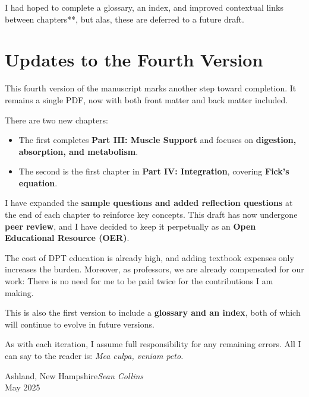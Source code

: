 I had hoped to complete a glossary, an index, and improved contextual links between chapters**, but alas, these are deferred to a future draft.  

\section*{Updates to the Fourth Version}

This fourth version of the manuscript marks another step toward completion. It remains a single PDF, now with both front matter and back matter included.  

There are two new chapters:
\begin{itemize}
  \item The first completes \textbf{Part III: Muscle Support} and focuses on \textbf{digestion, absorption, and metabolism}.
  \item The second is the first chapter in \textbf{Part IV: Integration}, covering \textbf{Fick’s equation}.
\end{itemize}

I have expanded the \textbf{sample questions and added reflection questions} at the end of each chapter to reinforce key concepts. This draft has now undergone \textbf{peer review}, and I have decided to keep it perpetually as an \textbf{Open Educational Resource (OER)}.  

The cost of DPT education is already high, and adding textbook expenses only increases the burden. Moreover, as professors, we are already compensated for our work: There is no need for me to be paid twice for the contributions I am making.  

This is also the first version to include a \textbf{glossary and an index}, both of which will continue to evolve in future versions.  

As with each iteration, I assume full responsibility for any remaining errors. All I can say to the reader is:  
\textit{Mea culpa, veniam peto.}

\vspace{\baselineskip}
\begin{flushright}\noindent
Ashland, New Hampshire\hfill {\it Sean  Collins}\\
May 2025\hfill {\it \hspace{1cm} }\\
\end{flushright}




